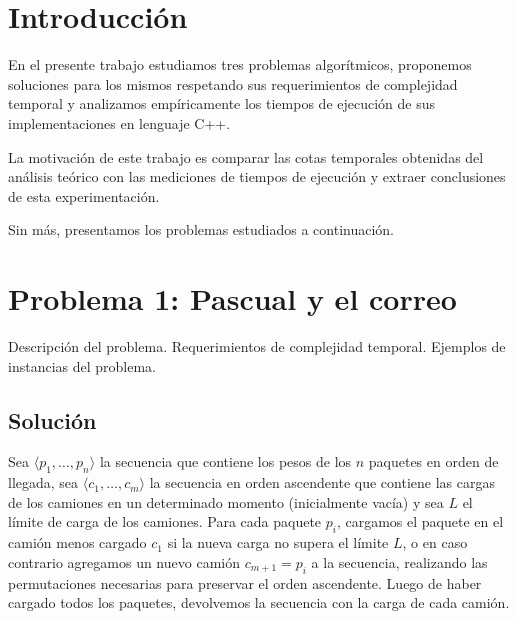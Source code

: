 \documentclass[a4paper,10pt,twoside]{article}
\begin{document}
\newpage




\tableofcontents

\newpage




\section{Introducción}

En el presente trabajo estudiamos tres problemas algorítmicos, proponemos soluciones para los mismos respetando sus requerimientos de complejidad temporal y analizamos empíricamente los tiempos de ejecución de sus implementaciones en lenguaje C++.

La motivación de este trabajo es comparar las cotas temporales obtenidas del análisis teórico con las mediciones de tiempos de ejecución y extraer conclusiones de esta experimentación.

Sin más, presentamos los problemas estudiados a continuación.




\section{Problema 1: Pascual y el correo}

Descripción del problema. Requerimientos de complejidad temporal. Ejemplos de instancias del problema.


\subsection{Solución}

Sea $\langle p_1, \ldots, p_n \rangle$ la secuencia que contiene los pesos de los $n$ paquetes en orden de llegada, sea $\langle c_1, \ldots, c_m \rangle$ la secuencia en orden ascendente que contiene las cargas de los camiones en un determinado momento (inicialmente vacía) y sea $L$ el límite de carga de los camiones. Para cada paquete $p_i$, cargamos el paquete en el camión menos cargado $c_1$ si la nueva carga no supera el límite $L$, o en caso contrario agregamos un nuevo camión $c_{m+1} = p_i$ a la secuencia, realizando las permutaciones necesarias para preservar el orden ascendente. Luego de haber cargado todos los paquetes, devolvemos la secuencia con la carga de cada camión.
\end{document}
